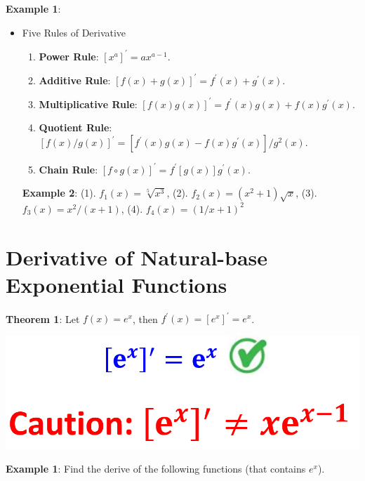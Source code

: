 \documentclass[
]{book}
\begin{document}
\textbf{Example 1}:

\begin{itemize}
\item
  Five Rules of Derivative

  \begin{enumerate}
  \def\labelenumi{\arabic{enumi}.}
  \item
    \textbf{Power Rule}: \([x^a]^\prime = a x^{a-1}\).
  \item
    \textbf{Additive Rule}: \([f(x) + g(x)]^\prime = f^\prime(x) + g^\prime(x)\).
  \item
    \textbf{Multiplicative Rule}: \([f(x)g(x)]^\prime = f^\prime(x)g(x) + f(x)g^\prime(x)\).
  \item
    \textbf{Quotient Rule}: \([f(x)/g(x)]^\prime = [f^\prime(x)g(x) - f(x)g^\prime(x)]/g^2(x)\).
  \item
    \textbf{Chain Rule}: \([f\circ g (x)]^\prime = f^\prime[g(x)] g^\prime(x)\).
  \end{enumerate}

  \textbf{Example 2}: (1). \(f_1(x) = \sqrt[5]{x^3}\), (2). \(f_2(x) = (x^2+1)\sqrt{x}\), (3). \(f_3(x) = x^2/(x+1)\), (4). \(f_4(x) = (1/x+1)^2\)
\end{itemize}

\hfill\break

\hypertarget{derivative-of-natural-base-exponential-functions}{%
\section{Derivative of Natural-base Exponential Functions}\label{derivative-of-natural-base-exponential-functions}}

\hfill\break

\textbf{Theorem 1}: Let \(f(x) = e^x\), then \(f^\prime(x) = [e^x]^\prime = e^x\).

\hfill\break

\begin{center}\includegraphics[width=0.7\linewidth]{img05/w05-derivativeExp} \end{center}

\textbf{Example 1}: Find the derive of the following functions (that contains \(e^x\)).
\end{document}
